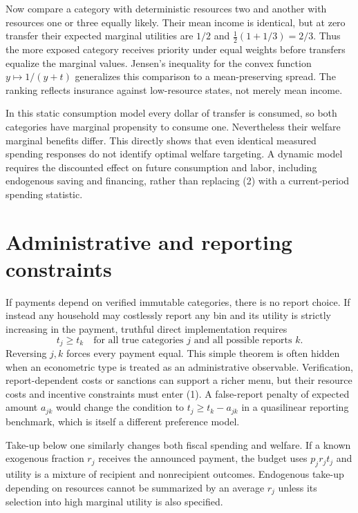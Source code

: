 \documentclass[11pt]{article}
\theoremstyle{definition}
\begin{document}
Now compare a category with deterministic resources two and another with
resources one or three equally likely. Their mean income is identical, but
at zero transfer their expected marginal utilities are $1/2$ and
$\tfrac12(1+1/3)=2/3$. Thus the more exposed category receives priority under
equal weights before transfers equalize the marginal values. Jensen's inequality
for the convex function $y\mapsto1/(y+t)$ generalizes this comparison to a
mean-preserving spread. The ranking reflects insurance against low-resource
states, not merely mean income.

In this static consumption model every dollar of transfer is consumed, so
both categories have marginal propensity to consume one. Nevertheless their
welfare marginal benefits differ. This directly shows that even identical
measured spending responses do not identify optimal welfare targeting.
A dynamic model requires the discounted effect on future consumption and labor,
including endogenous saving and financing, rather than replacing (2) with a
current-period spending statistic.

\section*{Administrative and reporting constraints}
If payments depend on verified immutable categories, there is no report choice.
If instead any household may costlessly report any bin and its utility is
strictly increasing in the payment, truthful direct implementation requires
\[
 t_j\ge t_k\quad\text{for all true categories }j
 \text{ and all possible reports }k.
\]
Reversing $j,k$ forces every payment equal. This simple theorem is often hidden
when an econometric type is treated as an administrative observable. Verification,
report-dependent costs or sanctions can support a richer menu, but their resource
costs and incentive constraints must enter (1). A false-report penalty of
expected amount $a_{jk}$ would change the condition to $t_j\ge t_k-a_{jk}$
in a quasilinear reporting benchmark, which is itself a different preference model.

Take-up below one similarly changes both fiscal spending and welfare. If a
known exogenous fraction $r_j$ receives the announced payment, the budget uses
$p_jr_jt_j$ and utility is a mixture of recipient and nonrecipient outcomes.
Endogenous take-up depending on resources cannot be summarized by an average
$r_j$ unless its selection into high marginal utility is also specified.
\end{document}
